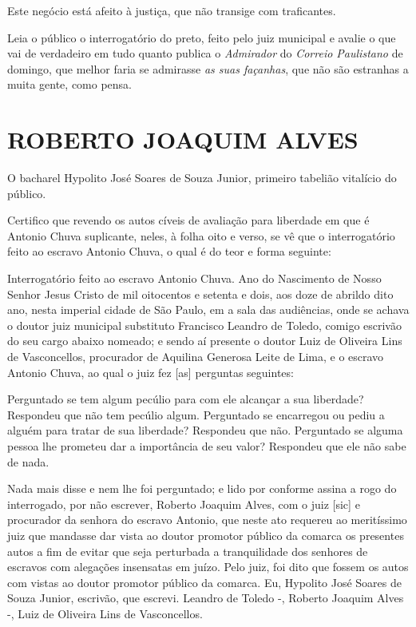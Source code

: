 {\begin{flushright}
Este negócio está afeito à justiça, que não transige com traficantes.

Leia o público o interrogatório do preto, feito pelo juiz municipal e
avalie o que vai de verdadeiro em tudo quanto publica o \emph{Admirador}
do \emph{Correio Paulistano} de domingo, que melhor faria se admirasse
\emph{as suas façanhas}, que não são estranhas a muita gente, como
pensa.

\section{ROBERTO JOAQUIM ALVES}

\asterisc{}

O bacharel Hypolito José Soares de Souza Junior, primeiro tabelião
vitalício do público.

Certifico que revendo os autos cíveis de avaliação para liberdade em que
é Antonio Chuva suplicante, neles, à folha oito e verso, se vê que o
interrogatório feito ao escravo Antonio Chuva, o qual é do teor e forma
seguinte:

Interrogatório feito ao escravo Antonio Chuva. Ano do Nascimento de
Nosso Senhor Jesus Cristo de mil oitocentos e setenta e dois, aos doze
de abrildo dito ano, nesta imperial cidade de São Paulo, em a sala das
audiências, onde se achava o doutor juiz municipal substituto Francisco
Leandro de Toledo, comigo escrivão do seu cargo abaixo nomeado; e sendo
aí presente o doutor Luiz de Oliveira Lins de Vasconcellos, procurador
de Aquilina Generosa Leite de Lima, e o escravo Antonio Chuva, ao qual o
juiz fez {[}as{]} perguntas seguintes:

Perguntado se tem algum pecúlio para com ele alcançar a sua liberdade?
Respondeu que não tem pecúlio algum. Perguntado se encarregou ou pediu a
alguém para tratar de sua liberdade? Respondeu que não. Perguntado se
alguma pessoa lhe prometeu dar a importância de seu valor? Respondeu que
ele não sabe de nada.

Nada mais disse e nem lhe foi perguntado; e lido por conforme assina a
rogo do interrogado, por não escrever, Roberto Joaquim Alves, com o juiz
{[}sic{]} e procurador da senhora do escravo Antonio, que neste ato
requereu ao meritíssimo juiz que mandasse dar vista ao doutor promotor
público da comarca os presentes autos a fim de evitar que seja
perturbada a tranquilidade dos senhores de escravos com alegações
insensatas em juízo. Pelo juiz, foi dito que fossem os autos com vistas
ao doutor promotor público da comarca. Eu, Hypolito José Soares de Souza
Junior, escrivão, que escrevi. Leandro de Toledo -, Roberto Joaquim
Alves -, Luiz de Oliveira Lins de Vasconcellos.


\end{flushright}}

